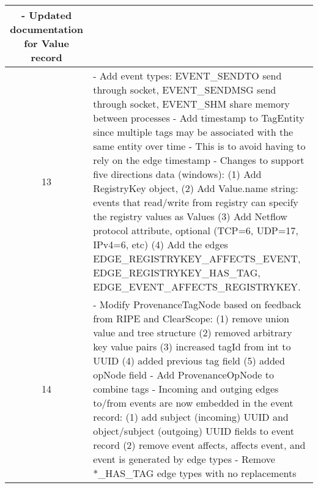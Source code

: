 \documentclass[10pt, conference, onecolumn]{IEEEtran}
\newcommand\tab[1][1em]{\hspace*{#1}}
\begin{document}
\begin{longtable}{|c|p{17cm}|}
  - Updated documentation for Value record
\\\hline
13 & \small
  - Add event types: \newline
  \tab EVENT\_SENDTO send through socket, \newline
  \tab EVENT\_SENDMSG send through socket, \newline
  \tab EVENT\_SHM share memory between processes \newline
  - Add timestamp to TagEntity since multiple tags may be associated with the same entity over time \newline
  \tab - This is to avoid having to rely on the edge timestamp \newline
  - Changes to support five directions data (windows): \newline
  \tab (1) Add RegistryKey object, \newline 
  \tab (2)  Add Value.name string: events that read/write from registry can specify the registry values as Values \newline
  \tab (3) Add Netflow protocol attribute, optional (TCP=6, UDP=17, IPv4=6, etc) \newline
  \tab (4) Add the edges EDGE\_REGISTRYKEY\_AFFECTS\_EVENT, EDGE\_REGISTRYKEY\_HAS\_TAG, \newline
  \tab\tab\tab EDGE\_EVENT\_AFFECTS\_REGISTRYKEY.
\\\hline
14 & \small
  - Modify ProvenanceTagNode based on feedback from RIPE and ClearScope: \newline
  \tab (1) remove union value and tree structure \newline
  \tab (2) removed arbitrary key value pairs \newline
  \tab (3) increased tagId from int to UUID \newline
  \tab (4) added previous tag field \newline
  \tab (5) added opNode field\newline
  - Add ProvenanceOpNode to combine tags \newline
  - Incoming and outging edges to/from events are now embedded in the event record: \newline
  \tab (1) add subject (incoming) UUID and object/subject (outgoing) UUID fields to event record \newline
  \tab (2) remove event affects, affects event, and event is generated by edge types \newline
  - Remove *\_HAS\_TAG edge types with no replacements \newline

\end{longtable}
\end{document}
